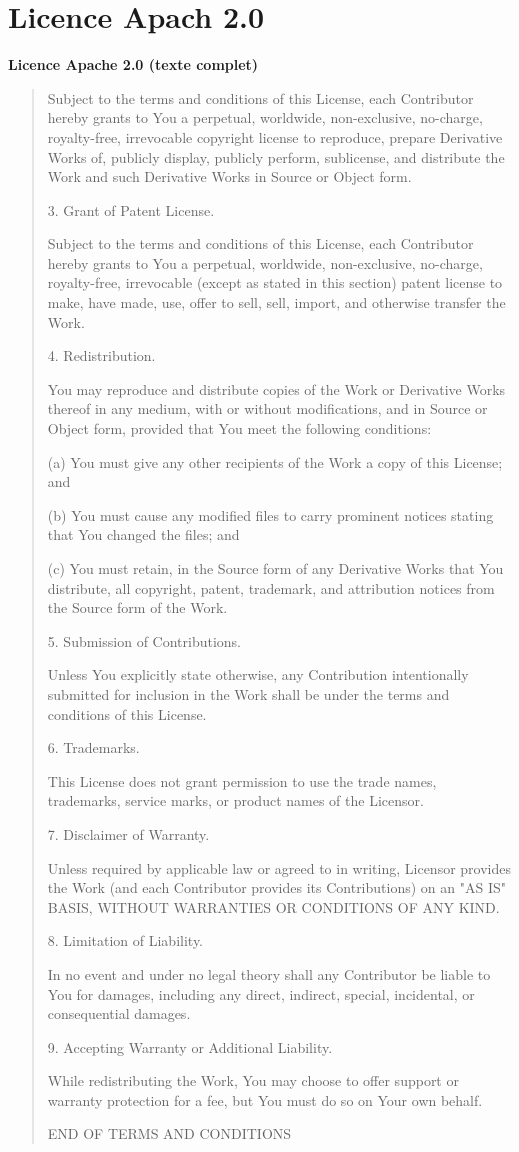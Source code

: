 \documentclass[12pt,a4paper]{article}
\begin{document}
\section{Licence Apach 2.0}
\bigskip
\noindent\textbf{Licence Apache 2.0 (texte complet)}

\begin{quote}
Subject to the terms and conditions of this License, each Contributor
hereby grants to You a perpetual, worldwide, non-exclusive, no-charge,
royalty-free, irrevocable copyright license to reproduce, prepare
Derivative Works of, publicly display, publicly perform, sublicense,
and distribute the Work and such Derivative Works in Source or Object
form.

3. Grant of Patent License.

Subject to the terms and conditions of this License, each Contributor
hereby grants to You a perpetual, worldwide, non-exclusive, no-charge,
royalty-free, irrevocable (except as stated in this section) patent
license to make, have made, use, offer to sell, sell, import, and
otherwise transfer the Work.

4. Redistribution.

You may reproduce and distribute copies of the Work or Derivative
Works thereof in any medium, with or without modifications, and in
Source or Object form, provided that You meet the following conditions:

(a) You must give any other recipients of the Work a copy of this
    License; and

(b) You must cause any modified files to carry prominent notices
    stating that You changed the files; and

(c) You must retain, in the Source form of any Derivative Works that
    You distribute, all copyright, patent, trademark, and attribution
    notices from the Source form of the Work.

5. Submission of Contributions.

Unless You explicitly state otherwise, any Contribution intentionally
submitted for inclusion in the Work shall be under the terms and
conditions of this License.

6. Trademarks.

This License does not grant permission to use the trade names,
trademarks, service marks, or product names of the Licensor.

7. Disclaimer of Warranty.

Unless required by applicable law or agreed to in writing, Licensor
provides the Work (and each Contributor provides its Contributions)
on an "AS IS" BASIS, WITHOUT WARRANTIES OR CONDITIONS OF ANY KIND.

8. Limitation of Liability.

In no event and under no legal theory shall any Contributor be liable
to You for damages, including any direct, indirect, special,
incidental, or consequential damages.

9. Accepting Warranty or Additional Liability.

While redistributing the Work, You may choose to offer support or
warranty protection for a fee, but You must do so on Your own behalf.

END OF TERMS AND CONDITIONS
\end{quote}
\end{document}
